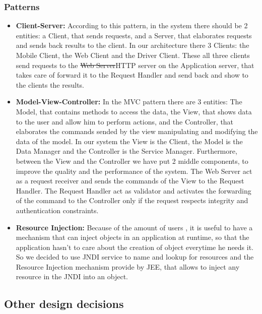 \subsubsection{Patterns}

\begin{itemize}
\item {\textbf{Client-Server:}} According to this pattern, in the system there should be 2 entities: a Client, that sends requests, and a Server, that elaborates requests and sends back results to the client. In our architecture there 3 Clients: the Mobile Client, the Web Client and the Driver Client. These all three  clients send requests to the \st{Web Server}HTTP server on the Application server, that takes care of forward it to the Request Handler and send back and show to the clients the results.


\item{\textbf{Model-View-Controller:}} In the MVC pattern there are 3 entities: The Model, that contains methods to access the data, the View, that shows data to the user and allow him to perform actions, and the Controller, that elaborates the commands sended by the view manipulating and modifying  the data of the model.
In our system the View is the Client, the Model is the Data Manager and the Controller is the Service Manager. Furthermore, between the View and the Controller we have put 2 middle components, to improve the quality and the performance of the system. The Web Server act as a request receiver and sends the commands of the View to the Request Handler. The Request Handler act as validator and activates the forwarding of the command to the Controller only if the request respects integrity and authentication constraints.

\item{\textbf{Resource Injection:}} Because of the amount of users , it is useful to have a mechanism that can inject objects in an application at runtime, so that the application hasn't to care about the creation of object everytime he needs it. So we decided to use JNDI service to name and lookup for resources and the Resource Injection mechanism provide by JEE, that allows to inject any resource in the JNDI into an object.

\end{itemize}



\subsection{Other design decisions }

